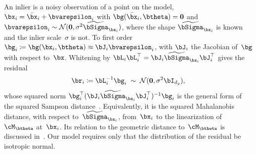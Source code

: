 \documentclass{article}
\newcommand{\bzero}{\mathbf{0}}             %
\newcommand{\btSigma}{\widetilde{\bSigma}}  %
\newcommand{\NN}{\mathcal{N}}               %
\begin{document}
An inlier is a noisy observation of a point on the model, $\bx_i =
	\bar\bx_i + \bvarepsilon_i$ with $\bg(\bar\bx_i,\btheta) = \bzero$ and
$\bvarepsilon_i \sim \NN(\bzero, \sigma^2\btSigma_{\bx_i})$, where the
shape $\btSigma_{\bx_i}$ is known and the inlier scale~$\sigma$ is
not.  To first order $\bg_i \coloneqq \bg(\bx_i,\btheta) \approx
	\bJ_i\bvarepsilon_i$, with $\bJ_i$ the Jacobian of~$\bg$ with respect
to~$\bx$. Whitening by $\bL_i\bL_i^\top =
	\bJ_i\btSigma_{\bx_i}\bJ_i^\top$ gives the residual
\begin{equation}
	\br_i \coloneqq \bL_i^{-1}\bg_i \;\sim\; \NN(\bzero,
	\sigma^2\bI_{d_g}),
	\label{eq:residual}
\end{equation}
whose squared norm
$\bg_i^\top(\bJ_i\btSigma_{\bx_i}\bJ_i^\top)^{-1}\bg_i$ is the general
form of the squared Sampson
distance~\cite{Sampson1982,Hartley2003,Chojnacki2000}. Equivalently,
it is the squared Mahalanobis distance, with respect
to~$\btSigma_{\bx_i}$, from~$\bx_i$ to the linearization
of~$\cM_{\btheta}$ at~$\bx_i$.  Its relation to the geometric distance
to~$\cM_{\btheta}$ is discussed in~\cite{Harker2006,Rydell2024}. Our
model requires only that the distribution of the residual be isotropic
normal.
\end{document}
